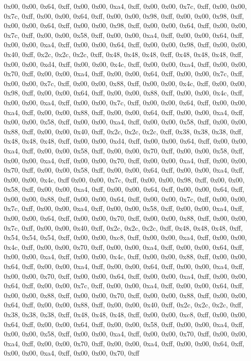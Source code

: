 0x00, 0x00, 0x64, 0xff, 0x00, 0x00, 0xa4, 0xff, 0x00, 0x00, 0x7c, 0xff, 0x00, 0x00, 0x7c, 0xff, 0x00, 0x00, 0x64, 0xff, 0x00, 0x00, 0x98, 0xff, 0x00, 0x00, 0x98, 0xff, 0x00, 0x00, 0x64, 0xff, 0x00, 0x00, 0x98, 0xff, 0x00, 0x00, 0x64, 0xff, 0x00, 0x00, 0x7c, 0xff, 0x00, 0x00, 0x58, 0xff, 0x00, 0x00, 0xa4, 0xff, 0x00, 0x00, 0x64, 0xff, 0x00, 0x00, 0xa4, 0xff, 0x00, 0x00, 0x64, 0xff, 0x00, 0x00, 0x98, 0xff, 0x00, 0x00, 0x40, 0xff, 0x2c, 0x2c, 0x2c, 0xff, 0x48, 0x48, 0x48, 0xff, 0x48, 0x48, 0x48, 0xff, 0x00, 0x00, 0xd4, 0xff, 0x00, 0x00, 0x4c, 0xff, 0x00, 0x00, 0xa4, 0xff, 0x00, 0x00, 0x70, 0xff, 0x00, 0x00, 0xa4, 0xff, 0x00, 0x00, 0x64, 0xff, 0x00, 0x00, 0x7c, 0xff, 0x00, 0x00, 0x7c, 0xff, 0x00, 0x00, 0x88, 0xff, 0x00, 0x00, 0x4c, 0xff, 0x00, 0x00, 0x98, 0xff, 0x00, 0x00, 0x64, 0xff, 0x00, 0x00, 0x88, 0xff, 0x00, 0x00, 0x4c, 0xff, 0x00, 0x00, 0xa4, 0xff, 0x00, 0x00, 0x7c, 0xff, 0x00, 0x00, 0x64, 0xff, 0x00, 0x00, 0xa4, 0xff, 0x00, 0x00, 0x88, 0xff, 0x00, 0x00, 0x64, 0xff, 0x00, 0x00, 0xa4, 0xff, 0x00, 0x00, 0x58, 0xff, 0x00, 0x00, 0xa4, 0xff, 0x00, 0x00, 0x58, 0xff, 0x00, 0x00, 0x88, 0xff, 0x00, 0x00, 0x40, 0xff, 0x2c, 0x2c, 0x2c, 0xff, 0x38, 0x38, 0x38, 0xff, 0x48, 0x48, 0x48, 0xff, 0x00, 0x00, 0xd4, 0xff, 0x00, 0x00, 0x64, 0xff, 0x00, 0x00, 0xa4, 0xff, 0x00, 0x00, 0x58, 0xff, 0x00, 0x00, 0x70, 0xff, 0x00, 0x00, 0x58, 0xff, 0x00, 0x00, 0xa4, 0xff, 0x00, 0x00, 0x70, 0xff, 0x00, 0x00, 0xa4, 0xff, 0x00, 0x00, 0x70, 0xff, 0x00, 0x00, 0x58, 0xff, 0x00, 0x00, 0x64, 0xff, 0x00, 0x00, 0xa4, 0xff, 0x00, 0x00, 0x4c, 0xff
0x00, 0x00, 0x7c, 0xff, 0x00, 0x00, 0x98, 0xff, 0x00, 0x00, 0x58, 0xff, 0x00, 0x00, 0xa4, 0xff, 0x00, 0x00, 0x64, 0xff, 0x00, 0x00, 0x64, 0xff, 0x00, 0x00, 0x88, 0xff, 0x00, 0x00, 0x64, 0xff, 0x00, 0x00, 0x7c, 0xff, 0x00, 0x00, 0x7c, 0xff, 0x00, 0x00, 0xa4, 0xff, 0x00, 0x00, 0x58, 0xff, 0x00, 0x00, 0xa4, 0xff, 0x00, 0x00, 0x64, 0xff, 0x00, 0x00, 0x70, 0xff, 0x00, 0x00, 0x88, 0xff, 0x00, 0x00, 0x7c, 0xff, 0x00, 0x00, 0x40, 0xff, 0x2c, 0x2c, 0x2c, 0xff, 0x48, 0x48, 0x48, 0xff, 0x54, 0x54, 0x54, 0xff, 0x00, 0x00, 0xc8, 0xff, 0x00, 0x00, 0xa4, 0xff, 0x00, 0x00, 0x4c, 0xff, 0x00, 0x00, 0x70, 0xff, 0x00, 0x00, 0xa4, 0xff, 0x00, 0x00, 0x64, 0xff, 0x00, 0x00, 0xa4, 0xff, 0x00, 0x00, 0x4c, 0xff, 0x00, 0x00, 0x88, 0xff, 0x00, 0x00, 0x64, 0xff, 0x00, 0x00, 0xa4, 0xff, 0x00, 0x00, 0x64, 0xff, 0x00, 0x00, 0xa4, 0xff, 0x00, 0x00, 0x70, 0xff, 0x00, 0x00, 0x64, 0xff, 0x00, 0x00, 0xa4, 0xff, 0x00, 0x00, 0x64, 0xff, 0x00, 0x00, 0x7c, 0xff, 0x00, 0x00, 0xa4, 0xff, 0x00, 0x00, 0x64, 0xff, 0x00, 0x00, 0x88, 0xff, 0x00, 0x00, 0x70, 0xff, 0x00, 0x00, 0x88, 0xff, 0x00, 0x00, 0x64, 0xff, 0x00, 0x00, 0x88, 0xff, 0x00, 0x00, 0x40, 0xff, 0x2c, 0x2c, 0x2c, 0xff, 0x38, 0x38, 0x38, 0xff, 0x48, 0x48, 0x48, 0xff, 0x00, 0x00, 0xc8, 0xff, 0x00, 0x00, 0x64, 0xff, 0x00, 0x00, 0x64, 0xff, 0x00, 0x00, 0x58, 0xff, 0x00, 0x00, 0xa4, 0xff, 0x00, 0x00, 0x58, 0xff, 0x00, 0x00, 0xa4, 0xff, 0x00, 0x00, 0x70, 0xff, 0x00, 0x00, 0xa4, 0xff, 0x00, 0x00, 0x70, 0xff, 0x00, 0x00, 0xa4, 0xff, 0x00, 0x00, 0x64, 0xff, 0x00, 0x00, 0xa4, 0xff, 0x00, 0x00, 0x70, 0xff
